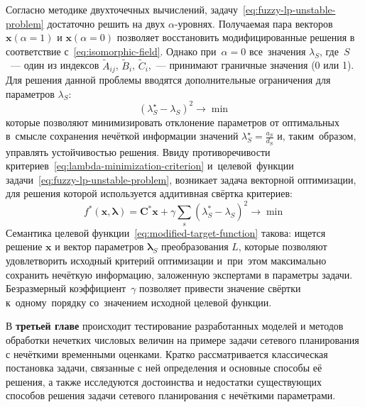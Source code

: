 Согласно методике двухточечных вычислений, задачу~\eqref{eq:fuzzy-lp-unstable-problem} достаточно решить на двух $\alpha$-уровнях. Получаемая пара векторов $\mathbf{x}\left( \alpha =1 \right)$ и $\mathbf{x}\left( \alpha =0 \right)$ позволяет восстановить модифицированные решения в соответствие с~\eqref{eq:isomorphic-field}. Однако при~$\alpha=0$ все~значения $\lambda_S$, где~$S$~--- один из индексов $\tilde A_{ij}$, $\tilde B_i$, $\tilde C_i$,~--- принимают граничные значения (0 или 1). Для решения данной проблемы вводятся дополнительные ограничения для параметров $\lambda_S$:
\begin{equation}
\label{eq:lambda-minimization-criterion}
  {\left( \lambda_{S}^{\star}-\lambda_S \right)}^2\to \min
\end{equation}
которые позволяют минимизировать отклонение параметров от оптимальных в~смысле сохранения нечёткой информации значений $\displaystyle \lambda_{S}^{\star}=\frac{a_S}{d_S}$ и, таким~образом, управлять устойчивостью решения. Ввиду противоречивости критериев~\eqref{eq:lambda-minimization-criterion} и~целевой~функции задачи~\eqref{eq:fuzzy-lp-unstable-problem}, возникает задача векторной оптимизации, для решения которой используется аддитивная свёртка критериев:
\begin{equation}
\label{eq:modified-target-function}
  f^{*}\left( \mathbf{x}, \mathbf{\lambda} \right)=\mathbf{C}^{*}\mathbf{x}+\gamma \sum\limits_{s}^{}{\left(\lambda_{S}^{*}-\lambda_S \right)}^{2} \to \min
\end{equation}
Семантика целевой функции~\eqref{eq:modified-target-function} такова: ищется решение $\mathbf{x}$ и вектор параметров $\mathbf{\lambda}_S$ преобразования $L$, которые позволяют удовлетворить исходный критерий оптимизации и~при~этом максимально сохранить нечёткую информацию, заложенную экспертами в параметры задачи. Безразмерный коэффициент~$\gamma$ позволяет привести значение свёртки к~одному~порядку со~значением исходной целевой функции.

В \textbf{третьей главе} происходит тестирование разработанных моделей и методов обработки нечетких числовых величин на примере задачи сетевого планирования с нечёткими временными оценками. Кратко рассматривается классическая постановка задачи, связанные с ней определения и основные способы её решения, а также исследуются достоинства и недостатки существующих способов решения задачи сетевого планирования с нечёткими параметрами.

